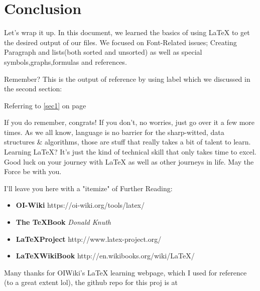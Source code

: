 \documentclass[a4paper,12pt]{article}
\begin{document}
\section{Conclusion}
Let's wrap it up. In this document, we learned the basics of
using LaTeX to get the desired output of our files. We focused
on Font-Related issues; Creating Paragraph and lists(both sorted and unsorted)
 as well as special symbols,graphs,formulas and references. 

Remember? This is the output of reference by using label which we discussed in the second section:

Referring to \ref{sec1} on page \pageref{sec1}

If you do remember, congrats! If you don't, no worries, just 
go over it a few more times. As we all know, language is no barrier
for the sharp-witted, data structures \& algorithms, those are stuff
 that really takes a bit of talent to learn. Learning \LaTeX? It's just
 the kind of technical skill that only takes time to excel. Good luck 
 on your journey with LaTeX as well as other journeys in life. May the Force 
 be with you.

I'll leave you here with a "itemize" of Further Reading:
\begin{itemize}
    \item \textbf{OI-Wiki} https://oi-wiki.org/tools/latex/
    \item \textbf{The \TeX Book} \textit{Donald Knuth}
    \item \textbf{\LaTeX Project}  http://www.latex-project.org/
    \item \textbf{\LaTeX WikiBook}  http://en.wikibooks.org/wiki/LaTeX/ 
\end{itemize}

Many thanks for OIWiki's LaTeX learning webpage, which I used for reference
(to a great extent lol), the github repo for this proj is at 

\listoffigures
\end{document}
